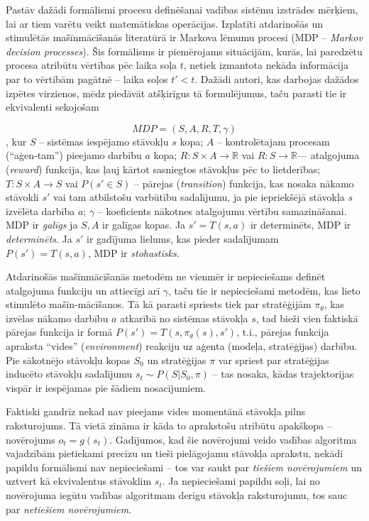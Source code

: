 \documentclass[12pt, a4paper]{article}
\numberwithin{equation}{section} %
\begin{document}
Pastāv dažādi formālismi procesu definēšanai vadības sistēmu izstrādes mērķiem, lai ar tiem varētu veikt matemātiskas operācijas. Izplatīti atdarinošās un stimulētās mašīnmācīšanās literatūrā ir Markova lēmumu procesi (MDP -- \textit{Markov decision processes}). Šis formālisms ir piemērojams  situācijām, kurās, lai paredzētu procesa atribūtu vērtības pēc laika soļa $t$, netiek izmantota nekāda informācija par to vērtībām pagātnē -- laika soļos $t' < t$. Dažādi autori, kas darbojas dažādos izpētes virzienos, mēdz piedāvāt atšķirīgus tā formulējumus, taču parasti tie ir ekvivalenti sekojošam \cite{attia2018global}

\begin{equation} 
    MDP = (S,A,R,T, \gamma)
\end{equation}
, kur $S$ -- sistēmas iespējamo stāvokļu $s$ kopa; $A$ -- kontrolētajam procesam (``aģen-tam'') pieejamo darbību $a$ kopa; $R: S \times A \rightarrow \mathbb{R}$ vai $R: S \rightarrow \mathbb{R}$--- atalgojuma (\textit{reward}) funkcija, kas ļauj kārtot sasniegtos stāvokļus pēc to lietderības; $T: S \times A \rightarrow S$ vai $P(s' \in S)$ -- pārejas (\textit{transition}) funkcija, kas nosaka nākamo stāvokli $s'$ vai tam atbilstošu varbūtību sadalījumu, ja pie iepriekšējā stāvokļa $s$ izvēlēta darbība $a$; $\gamma$ -- koeficients nākotnes atalgojumu vērtību samazināšanai. MDP ir \textit{galīgs} ja $S,A$ ir galīgas kopas. Ja $s' = T(s,a)$ ir determinēts, MDP ir \textit{determinēts}. Ja $s'$ ir gadījuma lielums, kas pieder sadalījumam $P(s')=T(s,a)$, MDP ir \textit{stohastisks}.

Atdarinošās mašīnmācīšanās metodēm ne vienmēr ir nepieciešams definēt atalgojuma funkciju un attiecīgi arī $\gamma$, taču tie ir nepieciešami metodēm, kas lieto stimulēto mašīn-mācīšanos. Tā kā parasti spriests tiek par stratēģijām $\pi_{\theta}$, kas izvēlas nākamo darbību $a$ atkarībā no sistēmas stāvokļa $s$, tad bieži vien faktiskā pārejas funkcija ir formā $P(s') = T(s, \pi_{\theta}(s), s')$, t.i., pārejas funkcija apraksta ``vides'' (\textit{environment}) reakciju uz aģenta (modeļa, stratēģijas) darbību. Pie sākotnējo stāvokļu kopas $S_0$ un stratēģijas $\pi$ var spriest par stratēģijas inducēto stāvokļu sadalījumu $s_t \sim P(S \vert S_0, \pi)$ -- tas nosaka, kādas trajektorijas vispār ir iespējamas pie šādiem nosacījumiem. 

Faktiski gandrīz nekad nav pieejams vides momentānā stāvokļa pilns raksturojums. Tā vietā zināma ir kāda to aprakstošu atribūtu apakškopa -- novērojums $o_t = g(s_t)$. Gadījumos, kad šie novērojumi veido vadības algoritma vajadzībām pietiekami precīzu un tieši pielāgojamu stāvokļa aprakstu, nekādi papildu formālismi nav nepieciešami -- tos var saukt par \textit{tiešiem novērojumiem} un uztvert kā ekvivalentus stāvoklim $s_t$. Ja nepieciešami papildu soļi, lai no novērojuma iegūtu vadības algoritmam derīgu stāvokļa raksturojumu, tos sauc par \textit{netiešiem novērojumiem}.
\end{document}

